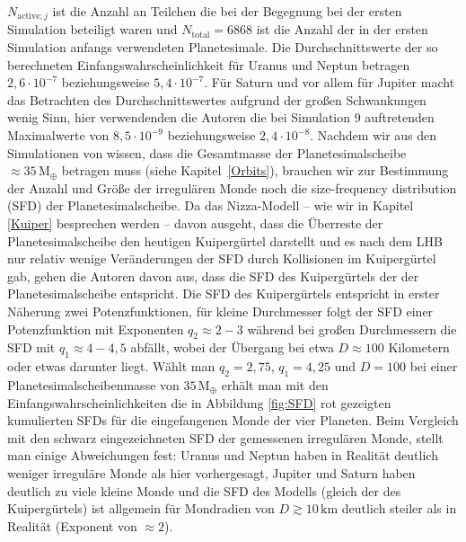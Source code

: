\documentclass[12pt,a4paper,twoside]{article}
\newcommand{\refsec}[1]{siehe Kapitel~\ref{#1}}
\newcommand{\ME}{\,\mathrm{M_\oplus}}
\begin{document}
$N_{\mathrm{active}; j}$ ist die Anzahl an Teilchen die bei der Begegnung bei der ersten Simulation beteiligt waren und $N_{\mathrm{total}} = 6868$ ist die Anzahl der in der ersten Simulation anfangs verwendeten Planetesimale\cite{Nesvorny2007}. %
Die Durchschnittswerte der so berechneten Einfangswahrscheinlichkeit für Uranus und Neptun betragen $2,6 \cdot 10^{-7}$ beziehungsweise $5,4 \cdot 10^{-7}$.
Für Saturn und vor allem für Jupiter macht das Betrachten des Durchschnittswertes aufgrund der großen Schwankungen wenig Sinn, hier verwendenden die Autoren die bei Simulation 9 auftretenden Maximalwerte von $8,5 \cdot 10^{-9}$ beziehungsweise $2,4 \cdot 10^{-8}$\cite{Nesvorny2007}.
Nachdem wir aus den Simulationen von \cite{Tsiganis2005} wissen, dass die Gesamtmasse der Planetesimalscheibe $\approx35 \ME$ betragen muss (\refsec{Orbits}), %
brauchen wir zur Bestimmung der Anzahl und Größe der irregulären Monde noch die size-frequency distribution (SFD) der Planetesimalscheibe. %
Da das Nizza-Modell – wie wir in Kapitel \ref{Kuiper} besprechen werden – davon ausgeht, dass die Überreste der Planetesimalscheibe den heutigen Kuipergürtel darstellt und es nach dem LHB nur relativ wenige Veränderungen der SFD durch Kollisionen im Kuipergürtel gab, gehen die Autoren davon aus, dass die SFD des Kuipergürtels der der Planetesimalscheibe entspricht\cite{Nesvorny2007}.
Die SFD des Kuipergürtels entspricht in erster Näherung zwei Potenzfunktionen, für kleine Durchmesser folgt der SFD einer Potenzfunktion mit Exponenten $q_2 \approx 2-3$ während bei großen Durchmessern die SFD mit $q_1 \approx 4-4,5$ abfällt, wobei der Übergang bei etwa $D \approx 100$ Kilometern oder etwas darunter liegt\cite{Nesvorny2007}. %
Wählt man $q_2 = 2,75$, $q_1 = 4,25$ und $D = 100$ bei einer Planetesimalscheibenmasse von $35 \ME$ erhält man mit den  Einfangswahrscheinlichkeiten die in Abbildung \ref{fig:SFD} rot gezeigten kumulierten SFDs für die eingefangenen Monde der vier Planeten. %
Beim Vergleich mit den schwarz eingezeichneten SFD der gemessenen irregulären Monde, %
stellt man einige Abweichungen fest:
Uranus und Neptun haben in Realität deutlich weniger irreguläre Monde als hier vorhergesagt, %
Jupiter und Saturn haben deutlich zu viele kleine Monde und die SFD des Modells (gleich der des Kuipergürtels) ist allgemein für Mondradien von $D\gtrsim 10 \, \mathrm{km}$ deutlich steiler als in Realität (Exponent von $\approx2$)\cite{Nesvorny2007}.
\end{document}
